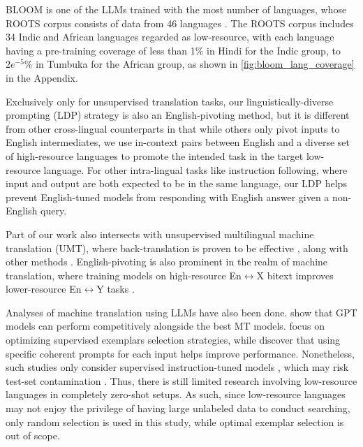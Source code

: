 BLOOM \citep{bloom_scao2022bloom} is one of the LLMs trained with the most number of languages, whose ROOTS corpus consists of data from 46 languages \citep{roots_corpus}. The ROOTS corpus includes 34 Indic and African languages regarded as low-resource, with each language having a pre-training coverage of less than 1\% in Hindi for the Indic group, to $2e^{-5}$\% in Tumbuka for the African group, as shown in \ref{fig:bloom_lang_coverage} in the Appendix. 

Exclusively only for unsupervised translation tasks, our linguistically-diverse prompting (LDP) strategy is also an English-pivoting method, but it is different from other cross-lingual counterparts \citep{llm_are_mling_cot_shi2022language,xlt_not_all_created_equal_huang2023not} in that while others only pivot inputs to English intermediates, we use in-context pairs between English and a diverse set of high-resource languages to promote the intended task in the target low-resource language. For other intra-lingual tasks like instruction following, where input and output are both expected to be in the same language, our LDP helps prevent English-tuned models \citet{llama2_touvron2023llama} from responding with English answer given a non-English query.

Part of our work also intersects with unsupervised multilingual machine translation (UMT), where back-translation is proven to be effective \citep{understanding_backtranslation_scale,lample2018phrase_unsup,conneau2019cross_xlm,mbart_liu2020multilingual,refine_lowres_umt_nguyen2022}, along with other methods \citep{criss2020,swavumt_nguyen2022contrastive}. English-pivoting is also prominent in the realm of machine translation, where training models on high-resource En$\leftrightarrow$X bitext improves lower-resource En$\leftrightarrow$Y tasks \citep{multilingual_view_garcia-etal-2020,harness-multilingual-garcia-etal-2021}. 

Analyses of machine translation using LLMs have also been done. \citet{howgood_gpt_mt_hendy2023good} show that GPT models can perform competitively alongside the best MT models. \citet{mmt_llm_analysis_zhu2023multilingual} focus on optimizing supervised exemplars selection strategies, while \citet{icl_maintain_coherence_sia2023context} discover that using specific coherent prompts for each input helps improve performance. Nonetheless, such studies only consider supervised instruction-tuned models \citep{instructgpt_ouyang2022training,bloomz_muennighoff2022crosslingual}, which may risk test-set contamination \citep{bloomz_muennighoff2022crosslingual}. Thus, there is still limited research involving low-resource languages in completely zero-shot setups. As such, since low-resource languages may not enjoy the privilege of having large unlabeled data to conduct searching, only random selection is used in this study, while optimal exemplar selection is out of scope.

